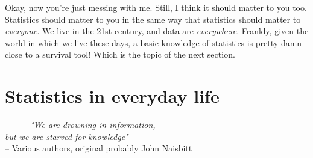 \documentclass[
]{book}
\begin{document}
Okay, now you're just messing with me. Still, I think it should matter to you too. Statistics should matter to you in the same way that statistics should matter to \emph{everyone}. We live in the 21st century, and data are \emph{everywhere}. Frankly, given the world in which we live these days, a basic knowledge of statistics is pretty damn close to a survival tool! Which is the topic of the next section.

\hypertarget{statistics-in-everyday-life}{%
\section{Statistics in everyday life}\label{statistics-in-everyday-life}}

~~~~~~\emph{"We are drowning in information,}\\
\hspace*{0.333em}\hspace*{0.333em}\hspace*{0.333em}\hspace*{0.333em}\hspace*{0.333em}\hspace*{0.333em}\emph{but we are starved for knowledge"}\\
\hspace*{0.333em}\hspace*{0.333em}\hspace*{0.333em}\hspace*{0.333em}\hspace*{0.333em}\hspace*{0.333em}\hspace*{0.333em}\hspace*{0.333em}\hspace*{0.333em}\hspace*{0.333em}\hspace*{0.333em}\hspace*{0.333em}\hspace*{0.333em}\hspace*{0.333em}\hspace*{0.333em}\hspace*{0.333em}\hspace*{0.333em}\hspace*{0.333em}\hspace*{0.333em}\hspace*{0.333em}\hspace*{0.333em}\hspace*{0.333em}-- Various authors, original probably John Naisbitt
\end{document}
